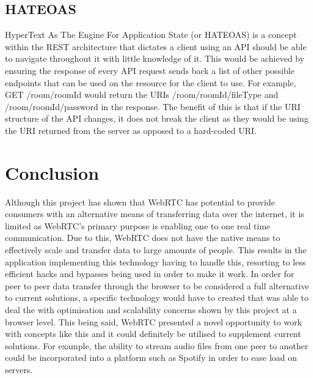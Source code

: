 \documentclass[]{report}
\begin{document}
			\subsection{HATEOAS}
			HyperText As The Engine For Application State (or HATEOAS) is a concept within the REST architecture that dictates a client using an API should be able to navigate throughout it with little knowledge of it. This would be achieved by ensuring the response of every API request sends back a list of other possible endpoints that can be used on the resource for the client to use. For example, GET /room/{roomId} would return the URIs /room/{roomId}/fileType and /room/{roomId}/password in the response. The benefit of this is that if the URI structure of the API changes, it does not break the client as they would be using the URI returned from the server as opposed to a hard-coded URI.
			
	\section{Conclusion}
		Although this project has shown that WebRTC has potential to provide consumers with an alternative means of transferring data over the internet, it is limited as WebRTC's primary purpose is enabling one to one real time communication. Due to this, WebRTC does not have the native means to effectively scale and transfer data to large amounts of people. This results in the application implementing this technology having to handle this, resorting to less efficient hacks and bypasses being used in order to make it work. In order for peer to peer data transfer through the browser to be considered a full alternative to current solutions, a specific technology would have to created that was able to deal the with optimisation and scalability concerns shown by this project at a browser level. This being said, WebRTC presented a novel opportunity to work with concepts like this and it could definitely be utilised to supplement current solutions. For example, the ability to stream audio files from one peer to another could be incorporated into a platform such as Spotify in order to ease load on servers. 
			
\end{document}
